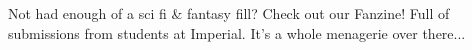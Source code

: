 Not had enough of a sci fi \& fantasy fill? Check out our Fanzine! Full of submissions from students at Imperial. It's a whole menagerie over there...
